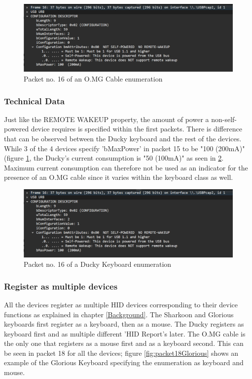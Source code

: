 \begin{figure}[H]
    \centering
    \includegraphics[width=0.75\linewidth]{visuals/no-remote-wakeup-100mA.png}
    \caption{Packet no. 16 of an O.MG Cable enumeration}
    \label{fig:packet16OMG}
\end{figure}

\subsubsection{Technical Data}

Just like the REMOTE WAKEUP property, the amount of power a non-self-powered device requires is specified within the first packets. There is difference that can be observed between the Ducky keyboard and the rest of the devices. While 3 of the 4 devices specify 'bMaxPower' in packet 15 to be "100 (200mA)" (figure \ref{fig:packet16OMG}, the Ducky's current consumption is "50 (100mA)" as seen in \ref{fig:packet16Ducky}. Maximum current consumption can therefore not be used as an indicator for the presence of an O.MG cable since it varies within the keyboard class as well. 


\begin{figure}[H]
    \centering
    \includegraphics[width=0.75\linewidth]{visuals/no-remote-wakeup-100mA.png}
    \caption{Packet no. 16 of a Ducky Keyboard enumeration}
    \label{fig:packet16Ducky}
\end{figure}


\subsubsection{Register as multiple devices}

All the devices register as multiple HID devices corresponding to their device functions as explained in chapter \ref{Background}. The Sharkoon and Glorious keyboards first register as a keyboard, then as a mouse. The Ducky registers as keyboard first and as multiple different 'HID Report's later. The O.MG cable is the only one that registers as a mouse first and as a keyboard second. This can be seen in packet 18 for all the devices; figure \ref{fig:packet18Glorious} shows an example of the Glorious Keyboard specifying the enumeration as keyboard and mouse. 

